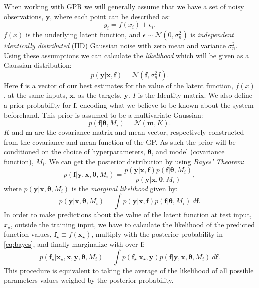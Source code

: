 \documentclass[a4paper,11pt,article,oneside]{memoir}
\begin{document}
When working with GPR we will generally assume that we have a set of noisy observations, $\mathbf{y}$, where each point can be described as:
%
\begin{equation}
y_i = f(x_i) + \epsilon_i. \nonumber
\end{equation}
%
$f(x)$ is the underlying latent function, and $\epsilon \sim \mathcal{N}(0,\sigma_n^2)$ is \emph{independent identically distributed} (IID) Gaussian noise with zero mean and variance $\sigma_n^2$. Using these assumptions we can calculate the \emph{likelihood} which will be given as a Gaussian distribution:
%
\begin{equation}
p(\mathbf{y}|\mathbf{x},\mathbf{f}) = \mathcal{N}(\mathbf{f},\sigma_n^2I).
\label{eq:likelihood}
\end{equation}
%
Here $\mathbf{f}$ is a vector of our best estimates for the value of the latent function, $f(x)$, at the same inputs, $\mathbf{x}$, as the targets, $\mathbf{y}$. $I$ is the Identity matrix. We also define a prior probability for $\mathbf{f}$, encoding what we believe to be known about the system beforehand. This prior is assumed to be a multivariate Gaussian:
%
\begin{equation}
p(\mathbf{f}|\boldsymbol{\theta},M_i) = \mathcal{N}(\mathbf{m},K).
\label{eq:prior}
\end{equation}
%
$K$ and $\mathbf{m}$ are the covariance matrix and mean vector, respectively constructed from the covariance and mean function of the GP. As such the prior will be conditioned on the choice of hyperparameters, $\boldsymbol{\theta}$, and model (covariance function), $M_i$. We can get the posterior distribution by using \emph{Bayes' Theorem}:
%
\begin{equation}
p(\mathbf{f}|\mathbf{y},\mathbf{x},\boldsymbol{\theta},M_i) = \frac{p(\mathbf{y}|\mathbf{x},\mathbf{f})p(\mathbf{f}|\boldsymbol{\theta},M_i)}{p(\mathbf{y}|\mathbf{x},\boldsymbol{\theta},M_i)},
\label{eq:bayes}
\end{equation}
%
where $p(\mathbf{y}|\mathbf{x},\boldsymbol{\theta},M_i)$ is the \emph{marginal likelihood} given by:
%
\begin{equation}
p(\mathbf{y}|\mathbf{x},\boldsymbol{\theta},M_i) = \int p(\mathbf{y}|\mathbf{x},\mathbf{f})p(\mathbf{f}|\boldsymbol{\theta},M_i) \: d\mathbf{f}.
\label{eq:marginal}
\end{equation}
%
In order to make predictions about the value of the latent function at test input, $x_\star$, outside the training input, we have to calculate the likelihood of the predicted function values, $\mathbf{f}_\star \equiv f(\mathbf{x}_\star)$, multiply with the posterior probability in \eqref{eq:bayes}, and finally marginalize with over $\mathbf{f}$:
%
\begin{equation}
p(\mathbf{f}_\star|\mathbf{x}_\star,\mathbf{x},\mathbf{y},\boldsymbol{\theta},M_i) = \int p(\mathbf{f}_\star|\mathbf{x}_\star,\mathbf{y}) p(\mathbf{f}|\mathbf{y},\mathbf{x},\boldsymbol{\theta},M_i) \: d\mathbf{f}.
\label{eq:pred}
\end{equation}
%
This procedure is equivalent to taking the average of the likelihood of all possible parameters values weighed by the posterior probability.
\end{document}
